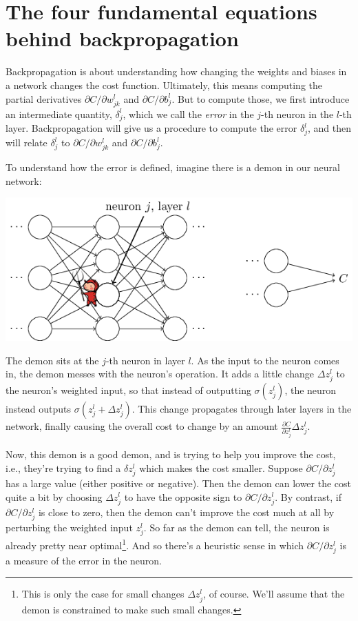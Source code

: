 \documentclass[a4paper,twoside,10pt]{book}
\begin{document}
\section{The four fundamental equations behind backpropagation}
\label{sec:2.4}
Backpropagation is about understanding how changing the weights and biases in a network changes the cost function. Ultimately, this means computing the partial derivatives $\partial{}C/\partial{}w^l_{jk}$ and $\partial{}C/\partial{}b^l_j$. But to compute those, we first introduce an intermediate quantity, $\delta^l_j$, which we call the \textit{error} in the $j$-th neuron in the $l$-th layer. Backpropagation will give us a procedure to compute the error $\delta^l_j$, and then will relate $\delta^l_j$ to $\partial{}C/\partial{}w^l_{jk}$ and $\partial{}C/\partial{}b^l_j$.

To understand how the error is defined, imagine there is a demon in our neural network:

\begin{center}
	\includegraphics[width=0.6\linewidth]{./figures/ch2/tikz19}
\end{center}
The demon sits at the $j$-th neuron in layer $l$. As the input to the neuron comes in, the demon messes with the neuron's operation. It adds a little change $\Delta{}z^l_j$ to the neuron's weighted input, so that instead of outputting $\sigma(z^l_j)$, the neuron instead outputs $\sigma(z^l_j+\Delta{}z^l_j)$. This change propagates through later layers in the network, finally causing the overall cost to change by an amount $\frac{\partial{}C}{\partial{}z^l_j}\Delta{}z^l_j$.

Now, this demon is a good demon, and is trying to help you improve the cost, i.e., they're trying to find a $\delta{}z^l_j$ which makes the cost smaller. Suppose $\partial{}C/\partial{}z^l_j$ has a large value (either positive or negative). Then the demon can lower the cost quite a bit by choosing $\Delta{}z^l_j$ to have the opposite sign to $\partial{}C/\partial{}z^l_j$. By contrast, if $\partial{}C/\partial{}z^l_j$ is close to zero, then the demon can't improve the cost much at all by perturbing the weighted input $z^l_j$. So far as the demon can tell, the neuron is already pretty near optimal\footnote{This is only the case for small changes $\Delta{}z^l_j$, of course. We'll assume that the demon is constrained to make such small changes.}. And so there's a heuristic sense in which $\partial{}C/\partial{}z^l_j$ is a measure of the error in the neuron.
\end{document}
